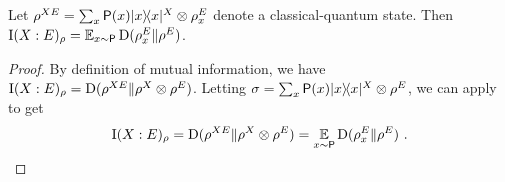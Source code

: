 \begin{proposition}
\label{prop:mutual-information-classical}
Let $\rho^{XE} = \sum_x \mathsf{P}(x) |x\rangle\! \langle x|^X \otimes \rho_x^E$ denote a classical-quantum state. Then $\mathrm{I}(X:E)_\rho = \operatorname*{\mathbb{E}}_{x \sim \mathsf{P}} \mathrm{D}(\rho_x^E \| \rho^E)$.
\end{proposition}
\begin{proof}
	By definition of mutual information, we have $\mathrm{I}(X : E)_\rho = \mathrm{D}(\rho^{XE} \| \rho^X \otimes \rho^E)$. Letting $\sigma = \sum_x \mathsf{P}(x) |x\rangle\! \langle x|^X \otimes \rho^E$, we can apply  to get
	\[
		\mathrm{I}(X : E)_\rho = \mathrm{D}(\rho^{XE} \| \rho^X \otimes \rho^E) = \operatorname*{\mathbb{E}}_{x \sim \mathsf{P}} \mathrm{D}(\rho_x^E \| \rho^E)~.
	\]
\end{proof}


%

%

